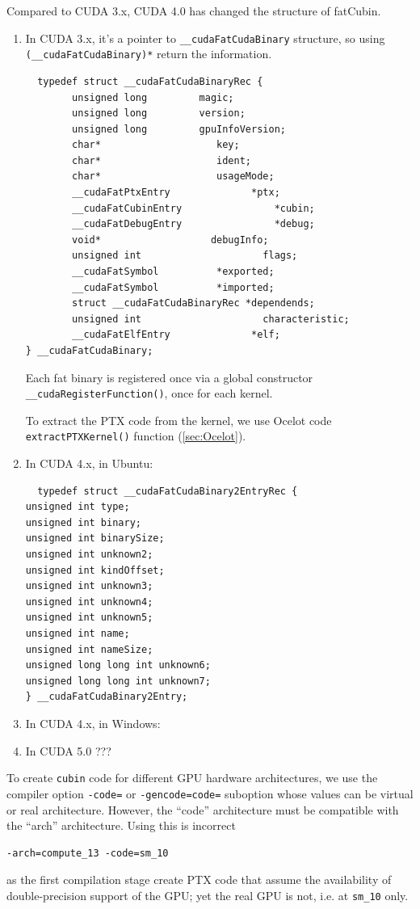 Compared to CUDA 3.x, CUDA 4.0 has changed the structure of fatCubin.
\begin{enumerate}
  \item In CUDA 3.x, it's a pointer to \verb!__cudaFatCudaBinary! structure, so
  using \verb!(__cudaFatCudaBinary)*! return the information.
  \begin{verbatim}
  typedef struct __cudaFatCudaBinaryRec {
        unsigned long         magic;
        unsigned long         version;
        unsigned long         gpuInfoVersion;
        char*                    key;
        char*                    ident;
        char*                    usageMode;
        __cudaFatPtxEntry              *ptx;
        __cudaFatCubinEntry                *cubin;
        __cudaFatDebugEntry                *debug;
        void*                   debugInfo;
        unsigned int                     flags;
        __cudaFatSymbol          *exported;
        __cudaFatSymbol          *imported;
        struct __cudaFatCudaBinaryRec *dependends;
        unsigned int                     characteristic;
        __cudaFatElfEntry              *elf;
} __cudaFatCudaBinary;
  \end{verbatim}
  Each fat binary is registered once via a global constructor
  \verb!__cudaRegisterFunction()!, once for each kernel. 
 
 To extract the PTX code from the kernel, we use Ocelot code
 \verb!extractPTXKernel()! function (\ref{sec:Ocelot}). 
  
  \item In CUDA 4.x, in Ubuntu:
  \begin{verbatim}
  typedef struct __cudaFatCudaBinary2EntryRec { 
unsigned int type;
unsigned int binary;
unsigned int binarySize;
unsigned int unknown2;
unsigned int kindOffset;
unsigned int unknown3;
unsigned int unknown4;
unsigned int unknown5;
unsigned int name;
unsigned int nameSize;
unsigned long long int unknown6;
unsigned long long int unknown7;
} __cudaFatCudaBinary2Entry;
  \end{verbatim}
  \item In CUDA 4.x, in Windows:
  
  \item In CUDA 5.0 ???
\end{enumerate}


To create \verb!cubin! code for different GPU hardware architectures, we use the
compiler option \verb!-code=! or \verb!-gencode=code=! suboption whose values
can be virtual or real architecture. However, the ``code'' architecture must be
compatible with the ``arch'' architecture.
Using this is incorrect
\begin{verbatim}
-arch=compute_13 -code=sm_10
\end{verbatim}
as the first compilation stage create PTX code that assume the availability of
double-precision support of the GPU; yet the real GPU is not, i.e. at
\verb!sm_10! only.

